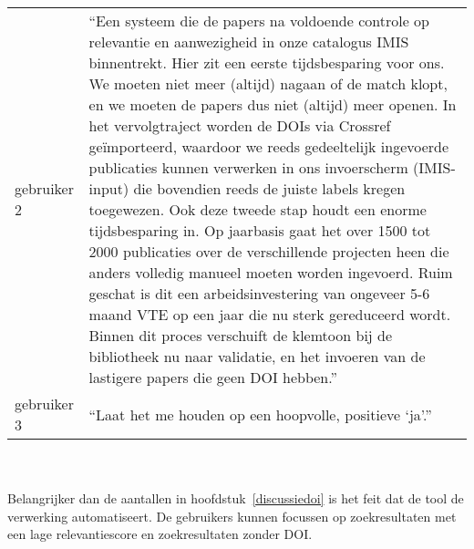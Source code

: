 \begin{table}[h!]
\begin{tabularx}{\textwidth}{|p{2cm}|X|}
        gebruiker 2&\enquote{Een systeem die de papers na voldoende controle op relevantie en aanwezigheid in onze catalogus IMIS binnentrekt. Hier zit een eerste tijdsbesparing voor ons. We moeten niet meer (altijd) nagaan of de match klopt, en we moeten de papers dus niet (altijd) meer openen. In het vervolgtraject worden de DOIs via Crossref geïmporteerd, waardoor we reeds gedeeltelijk ingevoerde publicaties kunnen verwerken in ons invoerscherm (IMIS-input) die bovendien reeds de juiste labels kregen toegewezen. Ook deze tweede stap houdt een enorme tijdsbesparing in. Op jaarbasis gaat het over 1500 tot 2000 publicaties over de verschillende projecten heen die anders volledig manueel moeten worden ingevoerd. Ruim geschat is dit een arbeidsinvestering van ongeveer 5-6 maand VTE op een jaar die nu sterk gereduceerd wordt. Binnen dit proces verschuift de klemtoon bij de bibliotheek nu naar validatie, en het invoeren van de lastigere papers die geen DOI hebben.}\\
        gebruiker 3&\enquote{Laat het me houden op een hoopvolle, positieve ‘ja’.}\\
        \hline
    \end{tabularx}
    \label{table:gebruikersfeedback}
\end{table}
\\\\
Belangrijker dan de aantallen in hoofdstuk~\ref{discussiedoi} is het feit dat de tool de verwerking automatiseert. De gebruikers kunnen focussen op zoekresultaten met een lage relevantiescore en zoekresultaten zonder DOI.
